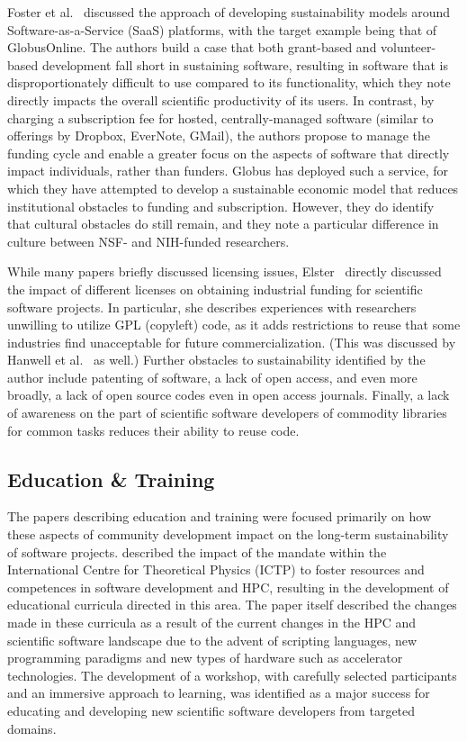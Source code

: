 \documentclass[11pt, oneside]{amsart}
\newcommand{\toolname}[1] {\textsf{#1}}
\begin{document}
Foster et al.~\cite{Foster_WSSSPE} discussed the approach of
developing sustainability models around Software-as-a-Service (SaaS)
platforms, with the target example being that of
\toolname{GlobusOnline}.  The authors build a case that both
grant-based and volunteer-based development fall short in sustaining
software, resulting in software that is disproportionately difficult
to use compared to its functionality, which they note directly impacts
the overall scientific productivity of its users.  In contrast, by
charging a subscription fee for hosted, centrally-managed software
(similar to offerings by \toolname{Dropbox}, \toolname{EverNote},
\toolname{GMail}), the authors propose to manage the funding cycle and
enable a greater focus on the aspects of software that directly impact
individuals, rather than funders.  \toolname{Globus} has deployed such
a service, for which they have attempted to develop a sustainable
economic model that reduces institutional obstacles to funding and
subscription.  However, they do identify that cultural obstacles do
still remain, and they note a particular difference in culture between
NSF- and NIH-funded researchers.

While many papers briefly discussed licensing issues,
Elster~\cite{Elster_WSSSPE} directly discussed the impact of different
licenses on obtaining industrial funding for scientific software
projects.  In particular, she describes experiences with researchers
unwilling to utilize GPL (copyleft) code, as it adds restrictions to
reuse that some industries find unacceptable for future
commercialization.  (This was discussed by Hanwell et
al.~\cite{Hanwell_WSSSPE} as well.)  Further obstacles to
sustainability identified by the author include patenting of software,
a lack of open access, and even more broadly, a lack of open source
codes even in open access journals.  Finally, a lack of awareness on
the part of scientific software developers of commodity libraries for
common tasks reduces their ability to reuse code.

\subsection{Education \& Training}

The papers describing education and training were focused primarily on
how these aspects of community development impact on the long-term
sustainability of software projects.  \cite{Girotto_WSSSPE} described
the impact of the mandate within the International Centre for
Theoretical Physics (ICTP) to foster resources and competences in
software development and HPC, resulting in the development of
educational curricula directed in this area.  The paper itself
described the changes made in these curricula as a result of the
current changes in the HPC and scientific software landscape due to
the advent of scripting languages, new programming paradigms and new
types of hardware such as accelerator technologies.  The development
of a workshop, with carefully selected participants and an immersive
approach to learning, was identified as a major success for educating
and developing new scientific software developers from targeted
domains.
\end{document}
